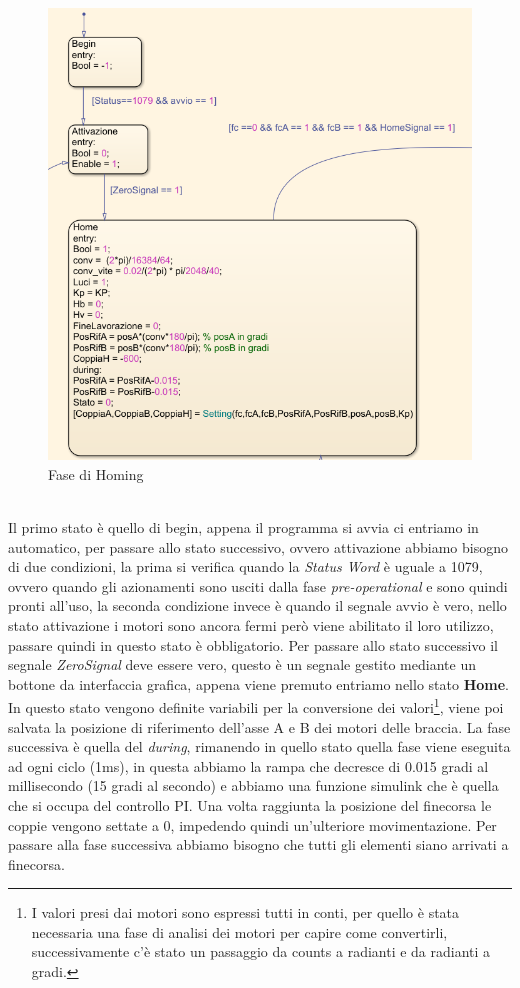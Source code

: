\begin{figure}[ht]
\begin{center}
    \includegraphics[scale=0.8]{Immagini/Sperimentale/state1new.png}
    \caption{Fase di Homing}
    \label{fig:Zero}
\end{center}
\end{figure}
\\Il primo stato è quello di begin, appena il programma si avvia ci entriamo in automatico, per passare allo stato successivo, ovvero attivazione abbiamo bisogno di due condizioni, la prima si verifica quando la \textit{Status Word} è uguale a 1079, ovvero quando gli azionamenti sono usciti dalla fase \textit{pre-operational} e sono quindi pronti all'uso, la seconda condizione invece è quando il segnale avvio è vero, nello stato attivazione i motori sono ancora fermi però viene abilitato il loro utilizzo, passare quindi in questo stato è obbligatorio. Per passare allo stato successivo il segnale \textit{ZeroSignal} deve essere vero, questo è un segnale gestito mediante un bottone da interfaccia grafica, appena viene premuto entriamo nello stato \textbf{Home}. In questo stato vengono definite variabili per la conversione dei valori\footnote{I valori presi dai motori sono espressi tutti in conti, per quello è stata necessaria una fase di analisi dei motori per capire come convertirli, successivamente c'è stato un passaggio da counts a radianti e da radianti a gradi.}, viene poi salvata la posizione di riferimento dell'asse A e B dei motori delle braccia. La fase successiva è quella del \textit{during}, rimanendo in quello stato quella fase viene eseguita ad ogni ciclo (1ms), in questa abbiamo la rampa che decresce di 0.015 gradi al millisecondo (15 gradi al secondo) e abbiamo una funzione simulink che è quella che si occupa del controllo PI. Una volta raggiunta la posizione del finecorsa le coppie vengono settate a 0, impedendo quindi un'ulteriore movimentazione. Per passare alla fase successiva abbiamo bisogno che tutti gli elementi siano arrivati a finecorsa.
